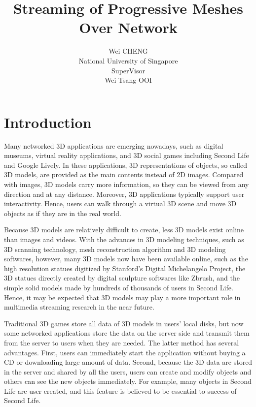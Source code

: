 \documentclass[11pt, a4paper]{report}
\title{Streaming of Progressive Meshes Over Network}
\author{Wei CHENG\\
National University of Singapore\\
SuperVisor\\
Wei Tsang OOI}
\begin{document}
\maketitle
\doublespacing
\begin{abstract}
\end{abstract}
\chapter{Introduction}
\label{c:intro}
    Many networked 3D applications are emerging nowadays, 
    such as digital museums, virtual reality applications, 
    and 3D social games including Second Life and Google Lively. 
    In these applications, 3D representations of objects, 
    so called 3D models, are provided as the main contents instead of 2D images. 
    Compared with images, 3D models carry more information, 
    so they can be viewed from any direction and at any distance. 
    Moreover, 3D applications typically support user interactivity. 
    Hence, users can walk through a virtual 3D scene and move 3D objects
    as if they are in the real world. 

    Because 3D models are relatively difficult to create, 
    less 3D models exist online than images and videos. 
    With the advances in 3D modeling techniques, 
    such as 3D scanning technology, mesh reconstruction algorithm
    and 3D modeling softwares, however, many 3D models now have been available online, 
    such as the high resolution statues digitized by Stanford’s Digital Michelangelo Project,
    the 3D statues directly created by digital sculpture softwares like Zbrush, 
    and the simple solid models made by hundreds of thousands of users in Second Life. 
    Hence, it may be expected that 3D models may play a more important role 
    in multimedia streaming research in the near future.

    Traditional 3D games store all data of 3D models in users’ local disks, 
    but now some networked applications store the data on the server side 
    and transmit them from the server to users when they are needed. 
    The latter method has several advantages. 
    First, users can immediately start the application without buying a CD
    or downloading large amount of data. 
    Second, because the 3D data are stored in the server and shared by all the users, 
    users can create and modify objects and others can see the new objects immediately. 
    For example, many objects in Second Life are user-created, 
    and this feature is believed to be essential to success of Second Life. 
\end{document}
